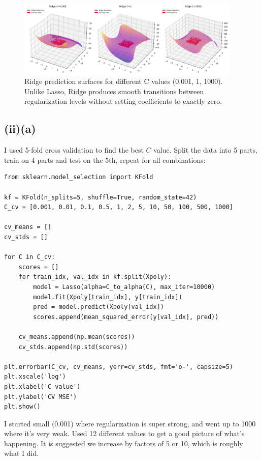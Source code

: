 \documentclass[11pt,a4paper]{article}
\begin{document}
\begin{figure}[H]
\centering
\includegraphics[width=0.95\textwidth]{figures/05_ridge_prediction_surfaces.png}
\caption{Ridge prediction surfaces for different C values (0.001, 1, 1000). Unlike Lasso, Ridge produces smooth transitions between regularization levels without setting coefficients to exactly zero.}
\label{fig:ridge_surfaces}
\end{figure}

\subsection*{(ii)(a)}

I used 5-fold cross validation to find the best $C$ value. Split the data into 5 parts, train on 4 parts and test on the 5th, repeat for all combinations:

\begin{lstlisting}
from sklearn.model_selection import KFold

kf = KFold(n_splits=5, shuffle=True, random_state=42)
C_cv = [0.001, 0.01, 0.1, 0.5, 1, 2, 5, 10, 50, 100, 500, 1000]

cv_means = []
cv_stds = []

for C in C_cv:
    scores = []
    for train_idx, val_idx in kf.split(Xpoly):
        model = Lasso(alpha=C_to_alpha(C), max_iter=10000)
        model.fit(Xpoly[train_idx], y[train_idx])
        pred = model.predict(Xpoly[val_idx])
        scores.append(mean_squared_error(y[val_idx], pred))
    
    cv_means.append(np.mean(scores))
    cv_stds.append(np.std(scores))

plt.errorbar(C_cv, cv_means, yerr=cv_stds, fmt='o-', capsize=5)
plt.xscale('log')
plt.xlabel('C value')
plt.ylabel('CV MSE')
plt.show()
\end{lstlisting}

I started small (0.001) where regularization is super strong, and went up to 1000 where it's very weak. Used 12 different values to get a good picture of what's happening. It is suggested we increase by factors of 5 or 10, which is roughly what I did.
\end{document}
